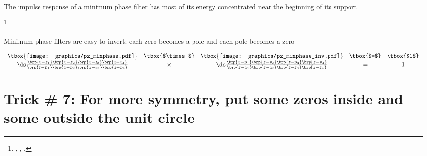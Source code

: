 The impulse response of a minimum phase filter has most of its energy concentrated
near the beginning of its support

\footnote{
  ,
  ,  %
  ,  %
  }
\label{thm:ztr_redp}
\\




Minimum phase filters are easy to invert: each zero becomes a pole and each pole becomes a zero

$\begin{array}{ccccc}
     \tbox{\texttt{[image: graphics/pz\_minphase.pdf]}}
    &\tbox{$\times$}&
     \tbox{\texttt{[image: graphics/pz\_minphase\_inv.pdf]}}
    &\tbox{$=$}&
     \tbox{$1$}
  \\
  \ds\frac{\brp{z-z_1}\brp{z-z_2}\brp{z-z_3}\brp{z-z_4}}
          {\brp{z-p_1}\brp{z-p_2}\brp{z-p_3}\brp{z-p_4}}
  &\times&
  \ds\frac{\brp{z-p_1}\brp{z-p_2}\brp{z-p_3}\brp{z-p_4}}
          {\brp{z-z_1}\brp{z-z_2}\brp{z-z_3}\brp{z-z_4}}
    &=& 1
\end{array}$



\section*{Trick \# 7: For more symmetry, put some zeros inside and some outside the unit circle}






